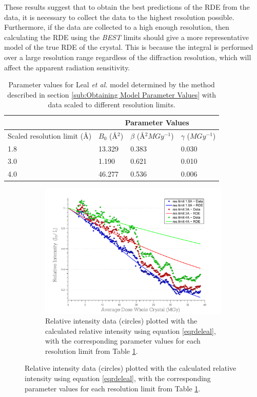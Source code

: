 These results suggest that to obtain the best predictions of the RDE from the data, it is necessary to collect the data to the highest resolution possible.
Furthermore, if the data are collected to a high enough resolution, then calculating the RDE using the \textit{BEST} limits should give a more representative model of the true RDE of the crystal.
This is because the integral is performed over a large resolution range regardless of the diffraction resolution, which will affect the apparent radiation sensitivity.

\begin{table}[ht!]
\small
\captionsetup{justification=centering}
	\caption[Parameter values for Leal \emph{et al.} model for data scaled to different resolution limits.]{Parameter values for Leal \emph{et al.} model determined by the method described in section \ref{sub:Obtaining Model Parameter Values} with data scaled to different resolution limits.}
	\centering
	\begin{tabular}{p{4cm} p{2.4cm} p{2.4cm} p{2cm}}
	\cline{2-4}
		& \multicolumn{3}{c}{Parameter Values} \\
		\hline
		Scaled resolution limit (\AA)			&$B_0$ (\AA$^2$)	  &$\beta$ (\AA$^2MGy^{-1}$) 	 	&$\gamma$ ($MGy^{-1}$)		\\
		\hline
		1.8     													&13.329	    &0.383 			&0.030			\\
		3.0     													&1.190		&0.621  		&0.010			\\
		4.0     													&46.277		&0.536  		&0.006			\\
		\hline
	\end{tabular}
	\label{tab:RDE params3}
\end{table}
\begin{figure}
	\centering
	\begin{subfigure}[b]{1\textwidth}
        \centering
        \includegraphics[width=\textwidth]{figures/dwd/rescmpplot1.pdf}
        \caption{Relative intensity data (circles) plotted with the calculated relative intensity using equation \ref{eqrdeleal}, with the corresponding parameter values for each resolution limit from Table \ref{tab:RDE params3}.}
        \label{fig:Resolution comparison plot - scaled to diff res}
    \end{subfigure}
	\label{figres}
\end{figure}
